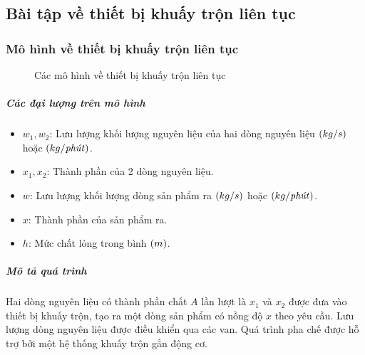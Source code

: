 \subsection{Bài tập về thiết bị khuấy trộn liên tục}
\subsubsection{Mô hình về thiết bị khuấy trộn liên tục}
    \begin{figure}[htp]
        \begin{center}
        \end{center}
        \caption{Các mô hình về thiết bị khuấy trộn liên tục} \label{Fig:binhchuachatlong-khuaytron}
    \end{figure}

\subparagraph{Các đại lượng trên mô hình}
    \begin{itemize}
		\item $w_1, w_2$: Lưu lượng khối lượng nguyên liệu của hai dòng nguyên liệu $\left({kg/s}\right)$ hoặc $\left({kg/\text{\textit{phút}}}\right)$.
		\item $x_1, x_2$: Thành phần của 2 dòng nguyên liệu.
		\item $w$: Lưu lượng khối lượng dòng sản phẩm ra $\left({kg/s}\right)$ hoặc $\left({kg/\text{\textit{phút}}}\right)$.
		\item $x$: Thành phần của sản phẩm ra.
		\item $h$: Mức chất lỏng trong bình $\left({m}\right)$.
	\end{itemize}

\subparagraph{Mô tả quá trình} Hai dòng nguyên liệu có thành phần chất $A$ lần lượt là $x_1$ và $x_2$ được đưa vào thiết bị khuấy trộn, tạo ra một dòng sản phẩm có nồng độ $x$ theo yêu cầu. Lưu lượng dòng nguyên liệu được điều khiển qua các van. Quá trình pha chế được hỗ trợ bởi một hệ thống khuấy trộn gắn động cơ.

